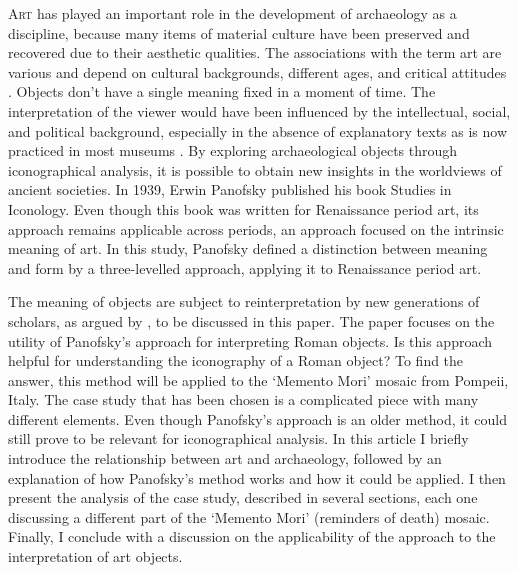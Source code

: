 \lettrine[nindent=0em,lines=3]{A}{rt} has played an important role in the development of archaeology as a discipline, because many items of material culture have been preserved and recovered due to their aesthetic qualities. The associations with the term art are various and depend on cultural backgrounds, different ages, and critical attitudes \parencite [309-310] {LaRocca_2010}. Objects don’t have a single meaning fixed in a moment of time. The interpretation of the viewer would have been influenced by the intellectual, social, and political background, especially in the absence of explanatory texts as is now practiced in most museums \parencite [49] {Rose_2010}. By exploring archaeological objects through iconographical analysis, it is possible to obtain new insights in the worldviews of ancient societies. In 1939, Erwin Panofsky published his book Studies in Iconology. Even though this book was written for Renaissance period art, its approach remains applicable across periods, an approach focused on the intrinsic meaning of art. In this study, Panofsky defined a distinction between meaning and form by a three-levelled approach, applying it to Renaissance period art. 

	The meaning of objects are subject to reinterpretation by new generations of scholars, as argued by \textcite [71]{Rose_2010}, to be discussed in this paper. The paper focuses on the utility of Panofsky’s approach for interpreting Roman objects. Is this approach helpful for understanding the iconography of a Roman object? To find the answer, this method will be applied to the ‘Memento Mori’ mosaic from Pompeii, Italy. The case study that has been chosen is a complicated piece with many different elements. Even though Panofsky’s approach is an older method, it could still prove to be relevant for iconographical analysis. In this article I briefly introduce the relationship between art and archaeology, followed by an explanation of how Panofsky’s method works and how it could be applied. I then present the analysis of the case study, described in several sections, each one discussing a different part of the ‘Memento Mori’ (reminders of death) mosaic. Finally, I conclude with a discussion on the applicability of the approach to the interpretation of art objects. 
	
